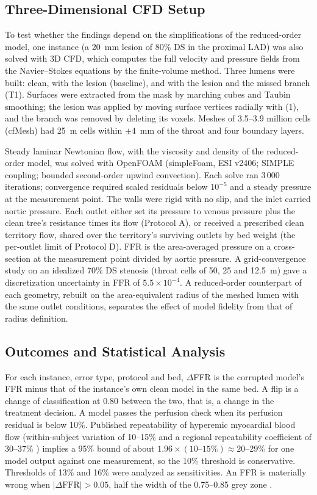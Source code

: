 \documentclass[journal,twoside,web]{ieeecolor}
\begin{document}
\subsection{Three-Dimensional CFD Setup}
To test whether the findings depend on the simplifications of the reduced-order model, one instance (a 20~mm lesion
of 80\% DS in the proximal LAD) was also solved with 3D CFD, which computes the full velocity and pressure fields
from the Navier--Stokes equations by the finite-volume method. Three lumens were built: clean, with the lesion (baseline), and with the
lesion and the missed branch (T1). Surfaces were extracted from the mask by marching cubes and Taubin smoothing; the
lesion was applied by moving surface vertices radially with (1), and the branch was removed by deleting its voxels.
Meshes of 3.5--3.9 million cells (cfMesh) had 25~\textmu m cells within $\pm 4$~mm of the throat and four boundary
layers.

Steady laminar Newtonian flow, with the viscosity and density of the reduced-order model, was solved with OpenFOAM
(simpleFoam, ESI v2406; SIMPLE coupling; bounded second-order upwind convection). Each solve ran
3\,000 iterations; convergence required scaled residuals below $10^{-5}$ and a steady pressure at the measurement
point. The walls were rigid with no slip, and the inlet carried aortic pressure. Each outlet either set its pressure
to venous pressure plus the clean tree's resistance times its flow (Protocol A), or received a prescribed clean
territory flow, shared over the territory's surviving outlets by bed weight (the per-outlet limit of Protocol D). FFR
is the area-averaged pressure on a cross-section at the measurement point divided by aortic pressure. A
grid-convergence study on an idealized 70\% DS stenosis (throat cells of 50, 25 and 12.5~\textmu m) gave a
discretization uncertainty in FFR of $5.5\times10^{-4}$. A reduced-order counterpart of each geometry, rebuilt on the
area-equivalent radius of the meshed lumen with the same outlet conditions, separates the effect of model fidelity
from that of radius definition.

\subsection{Outcomes and Statistical Analysis}
For each instance, error type, protocol and bed, $\Delta$FFR is the corrupted model's FFR minus that of the
instance's own clean model in the same bed. A flip is a change of classification at 0.80 between the two, that is,
a change in the treatment decision. A model passes the perfusion check when its perfusion residual is below 10\%.
Published repeatability of hyperemic myocardial blood flow (within-subject variation of 10--15\%
\cite{schindler2023} and a regional repeatability coefficient of 30--37\% \cite{brown2018}) implies a 95\% bound of
about $1.96 \times (10\text{--}15\%) \approx 20$--29\% for one model output against one measurement, so the 10\% threshold is conservative. Thresholds of 13\% and 16\% were analyzed as
sensitivities. An FFR is materially wrong when $|\Delta\mathrm{FFR}| > 0.05$, half the width of the 0.75--0.85 grey zone
\cite{petraco2013}.
\end{document}
